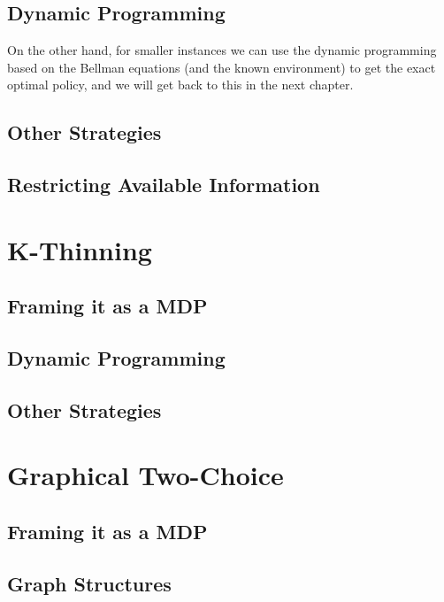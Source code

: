 \subsection{Dynamic Programming}


On the other hand, for smaller instances we can use the dynamic programming based on the Bellman equations (and the known environment) to get the exact optimal policy, and we will get back to this in the next chapter.

\subsection{Other Strategies}


\subsection{Restricting Available Information} \label{lesssharedstate}


\section{K-Thinning}


\subsection{Framing it as a MDP}


\subsection{Dynamic Programming}


\subsection{Other Strategies}


\section{Graphical Two-Choice}


\subsection{Framing it as a MDP}


\subsection{Graph Structures}


